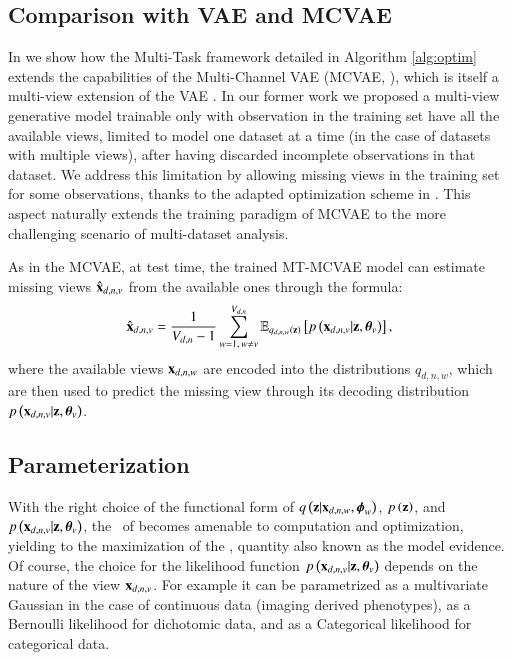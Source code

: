 	\subsection{Comparison with VAE and MCVAE}
	\label{ssec:comparison}
	In  we show how the Multi-Task framework detailed in Algorithm \ref{alg:optim} extends the capabilities of the Multi-Channel VAE (MCVAE, \cite{Antelmi2019}), which is itself a multi-view extension of the VAE \citep{Kingma2013,Rezende2014}.
	In our former work we proposed a multi-view generative model trainable only with observation in the training set have all the available views, limited to model one dataset at a time (in the case of datasets with multiple views), after having discarded incomplete observations in that dataset.
	We address this limitation by allowing missing views in the training set for some observations, thanks to the adapted optimization scheme in .
	This aspect naturally extends the training paradigm of MCVAE to the more challenging scenario of multi-dataset analysis.
	
	As in the MCVAE, at test time, the trained MT-MCVAE model can estimate missing views $\hat{\mathbf{x}}_{d,n,v}$ from the available ones through the formula:
	\begin{equation}\label{eq:reconstruction}
	\begin{aligned}
	\hat{\mathbf{x}}_{d,n,v} = \frac{1}{V_{d, n}-1} \sum_{w=1, \,w\neq v}^{V_{d, n}} \operatorname{\mathbb{E}}_{q_{d,n,w}(\mathbf{z})}\left[p\left(\mathbf{x}_{d,n,v}|\mathbf{z}, \boldsymbol{\theta}_v\right)\right],
	\end{aligned}
	\end{equation}
	where the available views $\mathbf{x}_{d,n,w}$ are encoded into the distributions $q_{d,n,w}$, which are then used to predict the missing view through its decoding distribution $p\left(\mathbf{x}_{d,n,v}|\mathbf{z}, \boldsymbol{\theta}_v\right)$.

\subsection{Parameterization}
\label{ssec:parameterization}

With the right choice of the functional form of $q\left(\mathbf{z}|\mathbf{x}_{d,n,w}, \boldsymbol{\phi}_w\right)$, $p\left(\mathbf{z}\right)$, and $p\left(\mathbf{x}_{d,n,v}|\mathbf{z}, \boldsymbol{\theta}_v\right)$, the \rhs\ of  becomes amenable to computation and optimization, yielding to the maximization of the \lhs, quantity also known as the model evidence.
Of course, the choice for the likelihood function $p\left(\mathbf{x}_{d,n,v}|\mathbf{z}, \boldsymbol{\theta}_v\right)$ depends on the nature of the view $\mathbf{x}_{d,n,v}$.
For example it can be parametrized as a multivariate Gaussian in the case of continuous data (\ie imaging derived phenotypes), as a Bernoulli likelihood for dichotomic data, and as a Categorical likelihood for categorical data.

